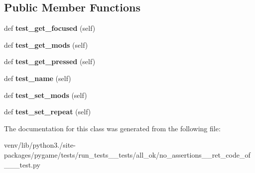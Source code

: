 \subsection*{Public Member Functions}
\begin{DoxyCompactItemize}
\item 
\mbox{\label{classpygame_1_1tests_1_1run__tests____tests_1_1all__ok_1_1no__assertions____ret__code__of__1____test_1_1_key_module_test_ab868c25e399bd79752f94cbdfc67c12c}} 
def {\bfseries test\+\_\+get\+\_\+focused} (self)
\item 
\mbox{\label{classpygame_1_1tests_1_1run__tests____tests_1_1all__ok_1_1no__assertions____ret__code__of__1____test_1_1_key_module_test_a9ae15389f5dde02bf9b8c1bb0020819f}} 
def {\bfseries test\+\_\+get\+\_\+mods} (self)
\item 
\mbox{\label{classpygame_1_1tests_1_1run__tests____tests_1_1all__ok_1_1no__assertions____ret__code__of__1____test_1_1_key_module_test_a9d5b6f2504cbb1b80154fe61972af415}} 
def {\bfseries test\+\_\+get\+\_\+pressed} (self)
\item 
\mbox{\label{classpygame_1_1tests_1_1run__tests____tests_1_1all__ok_1_1no__assertions____ret__code__of__1____test_1_1_key_module_test_a2c1650f20950102b541adee0b32f86c1}} 
def {\bfseries test\+\_\+name} (self)
\item 
\mbox{\label{classpygame_1_1tests_1_1run__tests____tests_1_1all__ok_1_1no__assertions____ret__code__of__1____test_1_1_key_module_test_aeaaa21fb8edbf12a68600074c3839523}} 
def {\bfseries test\+\_\+set\+\_\+mods} (self)
\item 
\mbox{\label{classpygame_1_1tests_1_1run__tests____tests_1_1all__ok_1_1no__assertions____ret__code__of__1____test_1_1_key_module_test_acff325339da67e34d41ce4b9e48910df}} 
def {\bfseries test\+\_\+set\+\_\+repeat} (self)
\end{DoxyCompactItemize}


The documentation for this class was generated from the following file\+:\begin{DoxyCompactItemize}
\item 
venv/lib/python3./site-\/packages/pygame/tests/run\+\_\+tests\+\_\+\+\_\+tests/all\+\_\+ok/no\+\_\+assertions\+\_\+\+\_\+ret\+\_\+code\+\_\+of\+\_\+\_\+\+\_\+test.\+py\end{DoxyCompactItemize}
